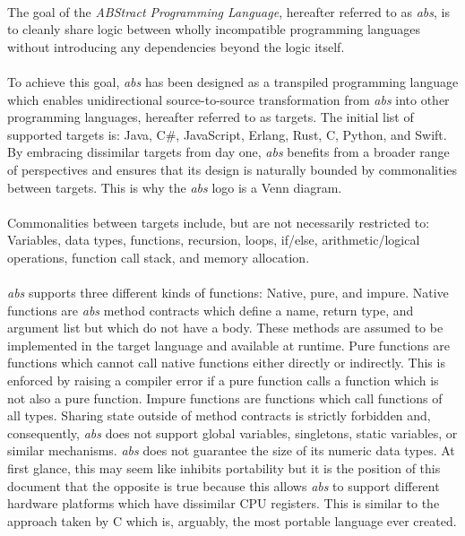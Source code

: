 \documentclass[hidelinks]{article}
\begin{document}
\paragraph{}The goal of the \textit{ABStract Programming Language}, hereafter referred to as \textit{abs}, is to cleanly share logic between wholly incompatible programming languages without introducing any dependencies beyond the logic itself.

\paragraph{}To achieve this goal, \textit{abs} has been designed as a transpiled programming language which enables unidirectional source-to-source transformation from \textit{abs} into other programming languages, hereafter referred to as targets. The initial list of supported targets is: Java, C\#, JavaScript, Erlang, Rust, C, Python, and Swift. By embracing dissimilar targets from day one, \textit{abs} benefits from a broader range of perspectives and ensures that its design is naturally bounded by commonalities between targets. This is why the \textit{abs} logo is a Venn diagram. 

\paragraph{}Commonalities between targets include, but are not necessarily restricted to: Variables, data types, functions, recursion, loops, if/else, arithmetic/logical operations, function call stack, and memory allocation.

\paragraph{}\textit{abs} supports three different kinds of functions: Native, pure, and impure. Native functions are \textit{abs} method contracts which define a name, return type, and argument list but which do not have a body. These methods are assumed to be implemented in the target language and available at runtime. Pure functions are functions which cannot call native functions either directly or indirectly. This is enforced by raising a compiler error if a pure function calls a function which is not also a pure function. Impure functions are functions which call functions of all types. Sharing state outside of method contracts is strictly forbidden and, consequently, \textit{abs} does not support global variables, singletons, static variables, or similar mechanisms. \textit{abs} does not guarantee the size of its numeric data types. At first glance, this may seem like inhibits portability but it is the position of this document that the opposite is true because this allows \textit{abs} to support different hardware platforms which have dissimilar CPU registers. This is similar to the approach taken by C which is, arguably, the most portable language ever created.
\end{document}
